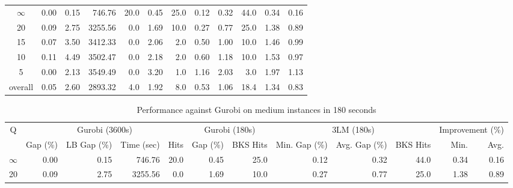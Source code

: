 \begin{table}[H]
\begin{tabular}{c rrrr rr rrr rr}
\cmidrule(lr){1-1} \cmidrule(lr){2-5} \cmidrule(lr){2-5} \cmidrule(lr){6-7} \cmidrule(lr){8-10} \cmidrule(lr){11-12}
$\infty$ &           0.00 &        0.15 &     746.76 & 20.0 &          0.45 &     25.0 &          0.12 &          0.32 &     44.0 &             0.34 & 0.16 \\
      20 &           0.09 &        2.75 &    3255.56 &  0.0 &          1.69 &     10.0 &          0.27 &          0.77 &     25.0 &             1.38 & 0.89 \\
      15 &           0.07 &        3.50 &    3412.33 &  0.0 &          2.06 &      2.0 &          0.50 &          1.00 &     10.0 &             1.46 & 0.99 \\
      10 &           0.11 &        4.49 &    3502.47 &  0.0 &          2.18 &      2.0 &          0.60 &          1.18 &     10.0 &             1.53 & 0.97 \\
       5 &           0.00 &        2.13 &    3549.49 &  0.0 &          3.20 &      1.0 &          1.16 &          2.03 &      3.0 &             1.97 & 1.13 \\
\midrule
 overall &           0.05 &        2.60 &    2893.32 &  4.0 &          1.92 &      8.0 &          0.53 &          1.06 &     18.4 &             1.34 & 0.83 \\
\bottomrule
\end{tabular}
\end{table}\begin{table}[H]
\centering
\caption{Performance against Gurobi on medium instances in 180 seconds}
\label{tab:3lm_resuts150T180}
\begin{tabular}{c rrrr rr rrr rr}
\toprule
       Q & \multicolumn{4}{c}{Gurobi (3600s)} & \multicolumn{2}{c}{Gurobi (180s)} & \multicolumn{3}{c}{3LM (180s)} & \multicolumn{2}{c}{Improvement (\%)} \\
         &       Gap (\%) & LB Gap (\%) & Time (sec) & Hits &      Gap (\%) & BKS Hits & Min. Gap (\%) & Avg. Gap (\%) & BKS Hits &             Min. & Avg. \\
\cmidrule(lr){1-1} \cmidrule(lr){2-5} \cmidrule(lr){2-5} \cmidrule(lr){6-7} \cmidrule(lr){8-10} \cmidrule(lr){11-12}
$\infty$ &           0.00 &        0.15 &     746.76 & 20.0 &          0.45 &     25.0 &          0.12 &          0.32 &     44.0 &             0.34 & 0.16 \\
      20 &           0.09 &        2.75 &    3255.56 &  0.0 &          1.69 &     10.0 &          0.27 &          0.77 &     25.0 &             1.38 & 0.89 \\

\end{tabular}
\end{table}
